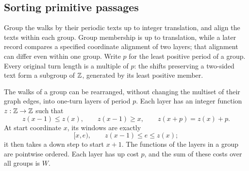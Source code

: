 \subsection{Sorting primitive passages}

Group the walks by their periodic texts up to integer translation, and align the texts within each group. Group membership is up to translation, while a later record compares a specified coordinate alignment of two layers; that alignment can differ even within one group. Write $p$ for the least positive period of a group. Every original turn length is a multiple of $p$: the shifts preserving a two-sided text form a subgroup of $\mathbb Z$, generated by its least positive member.

\begin{lemma}\label{lem:layers}
The walks of a group can be rearranged, without changing the multiset of their graph edges, into one-turn layers of period $p$. Each layer has an integer function $z:\mathbb Z\to\mathbb Z$ such that
\begin{equation}\label{eq:layer-properties}
z(x-1)\le z(x),\qquad z(x-1)\ge x,
\qquad z(x+p)=z(x)+p.
\end{equation}
At start coordinate $x$, its windows are exactly
\begin{equation}\label{eq:layer-vertical}
[x,e),\qquad z(x-1)\le e\le z(x);
\end{equation}
it then takes a down step to start $x+1$. The functions of the layers in a group are pointwise ordered. Each layer has up cost $p$, and the sum of these costs over all groups is $W$.
\end{lemma}

